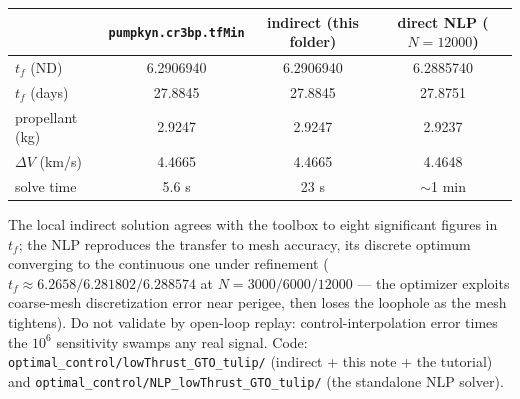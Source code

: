 \documentclass[11pt,letterpaper]{article}
\theoremstyle{noteplain}
\newcommand{\code}[1]{\texttt{#1}}
\begin{document}
\begin{center}
\begin{tabular}{lccc}
\toprule
 & \code{pumpkyn.cr3bp.tfMin} & indirect (this folder) & direct NLP ($N{=}12000$)\\
\midrule
$t_f$ (ND)        & 6.2906940 & 6.2906940 & 6.2885740 \\
$t_f$ (days)      & 27.8845   & 27.8845   & 27.8751 \\
propellant (kg)   & 2.9247    & 2.9247    & 2.9237 \\
$\Delta V$ (km/s) & 4.4665    & 4.4665    & 4.4648 \\
solve time        & 5.6 s     & 23 s      & $\sim$1 min \\
\bottomrule
\end{tabular}
\end{center}

The local indirect solution agrees with the toolbox to eight significant
figures in $t_f$; the NLP reproduces the transfer to mesh accuracy, its
discrete optimum converging to the continuous one under refinement
($t_f \approx 6.2658 / 6.281802 / 6.288574$ at $N = 3000/6000/12000$ --- the
optimizer exploits coarse-mesh discretization error near perigee, then
loses the loophole as the mesh tightens). Do not validate by open-loop
replay: control-interpolation error times the $10^6$ sensitivity swamps
any real signal. Code:
\code{optimal\_control/lowThrust\_GTO\_tulip/} (indirect + this note + the
tutorial) and \code{optimal\_control/NLP\_lowThrust\_GTO\_tulip/} (the
standalone NLP solver).
\end{document}
